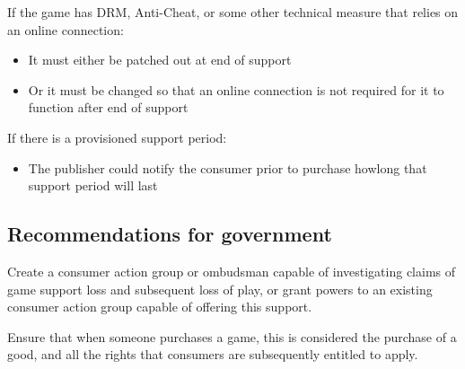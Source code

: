 If the game has DRM, Anti-Cheat, or some other technical measure that relies on an online connection:
\begin{itemize}
    \item It must either be patched out at end of support
    \item Or it must be changed so that an online connection is not required for it to function after end of support
\end{itemize}

If there is a provisioned support period:
\begin{itemize}
    \item The publisher could notify the consumer prior to purchase howlong that support period will last
\end{itemize}


\subsection{Recommendations for government}

Create a consumer action group or ombudsman capable of investigating claims of game support loss and subsequent loss of play,
or grant powers to an existing consumer action group capable of offering this support.

Ensure that when someone purchases a game, this is considered the purchase of a good, and all the rights that consumers are subsequently entitled to apply.
